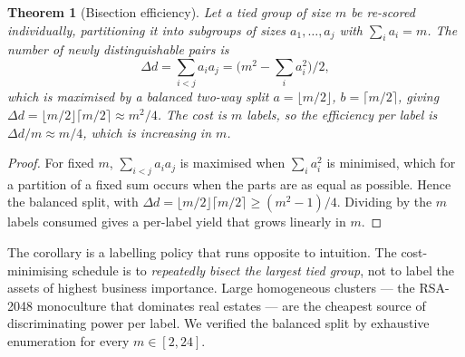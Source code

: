 \documentclass[conference,10pt]{IEEEtran}
\newtheorem{theorem}{Theorem}
\newcommand{\distinct}{d}
\begin{document}
\begin{theorem}[Bisection efficiency]
\label{thm:bisect}
Let a tied group of size $m$ be re-scored individually, partitioning it into subgroups of sizes
$a_1,\dots,a_j$ with $\sum_i a_i = m$. The number of newly distinguishable pairs is
\begin{equation}
\Delta \distinct = \sum_{i<j} a_i a_j = \bigl(m^2 - \textstyle\sum_i a_i^2\bigr)/2 ,
\end{equation}
which is maximised by a balanced two-way split $a=\lfloor m/2\rfloor$, $b=\lceil m/2\rceil$,
giving $\Delta \distinct = \lfloor m/2\rfloor\lceil m/2\rceil \approx m^2/4$. The cost is $m$
labels, so the efficiency per label is $\Delta\distinct/m \approx m/4$, which is
\emph{increasing in $m$}.
\end{theorem}
\begin{proof}
For fixed $m$, $\sum_{i<j} a_i a_j$ is maximised when $\sum_i a_i^2$ is minimised, which for a
partition of a fixed sum occurs when the parts are as equal as possible. Hence the balanced
split, with $\Delta\distinct = \lfloor m/2\rfloor\lceil m/2\rceil \ge (m^2-1)/4$. Dividing by the
$m$ labels consumed gives a per-label yield that grows linearly in $m$.
\end{proof}

The corollary is a labelling policy that runs opposite to intuition. The cost-minimising schedule
is to \emph{repeatedly bisect the largest tied group}, not to label the assets of highest business
importance. Large homogeneous clusters --- the RSA-2048 monoculture that dominates real estates
--- are the cheapest source of discriminating power per label. We verified the balanced split by
exhaustive enumeration for every $m \in [2,24]$.
\end{document}
